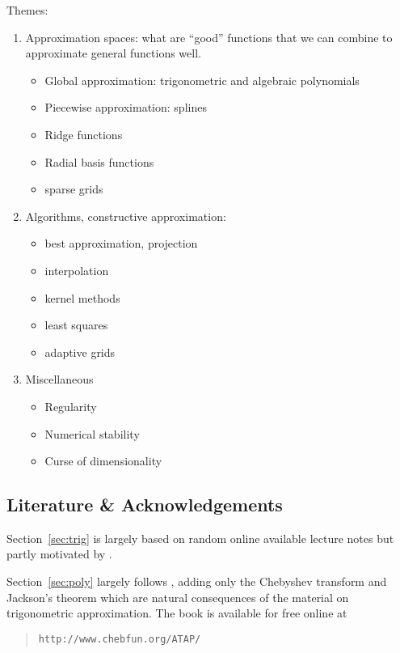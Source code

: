 Themes:
\begin{enumerate}
\item Approximation spaces: what are ``good'' functions that we can combine
    to approximate general functions well.
  \begin{itemize}
    \item Global approximation: trigonometric and algebraic  polynomials
    \item Piecewise approximation: splines
    \item Ridge functions
    \item Radial basis functions
    \item sparse grids
  \end{itemize}

\item Algorithms, constructive approximation:
  \begin{itemize}
    \item best approximation, projection
    \item interpolation
    \item kernel methods
    \item least squares
    \item adaptive grids
  \end{itemize}

\item Miscellaneous
  \begin{itemize}
    \item Regularity
    \item Numerical stability
    \item Curse of dimensionality
  \end{itemize}
\end{enumerate}


\subsection{Literature \& Acknowledgements}
%
\label{sec:acknowledgements}
%
Section~\ref{sec:trig} is largely based on random online available lecture notes
but partly motivated by \cite{Trefethen2000-fr,Trefethen2013-rg}.

Section~\ref{sec:poly} largely follows \cite{Trefethen2013-rg}, adding only the
Chebyshev transform and Jackson's theorem which are natural consequences of the
material on trigonometric approximation. The book \cite{Trefethen2013-rg} is
available for free online at 
\begin{quote}
  {\tt http://www.chebfun.org/ATAP/}
\end{quote}

